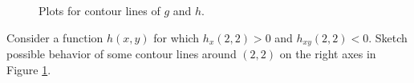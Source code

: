 \begin{activity}
\begin{figure}[ht]
\begin{center}
    \end{center}
    \caption{Plots for contour lines of $g$ and $h$.}
    \label{F:10.3.activity.grad}
  \end{figure}
\item Consider a function $h(x,y)$ for which $h_x(2,2) > 0$ and
  $h_{xy}(2,2) < 0$.  Sketch possible behavior of some contour
  lines around $(2,2)$ on the right axes in Figure \ref{F:10.3.activity.grad}.

    
\ea

\end{activity}
\aftera
